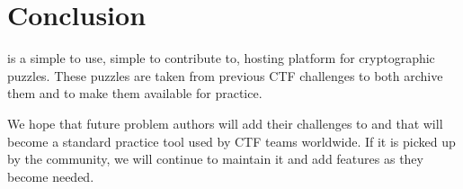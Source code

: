 \section{Conclusion}
\cvm{} is a simple to use, simple to contribute to, hosting platform
for cryptographic puzzles. These puzzles are taken from previous CTF
challenges to both archive them and to make them available for
practice.

We hope that future problem authors will add their challenges to
\cvm{} and that \cvm{} will become a standard practice tool used by
CTF teams worldwide. If it is picked up by the community, we will
continue to maintain it and add features as they become needed.
